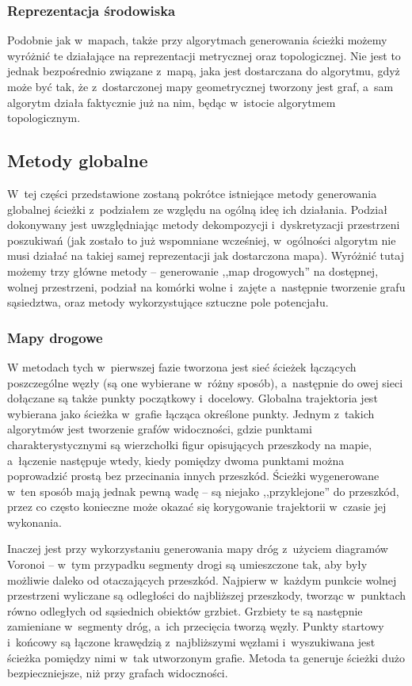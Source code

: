 \subsubsection{Reprezentacja środowiska}

Podobnie jak w~mapach, także przy algorytmach generowania ścieżki możemy wyróżnić
te działające na reprezentacji metrycznej oraz topologicznej. Nie jest to jednak
bezpośrednio związane z~mapą, jaka jest dostarczana do algorytmu, gdyż może być tak,
że z~dostarczonej mapy geometrycznej tworzony jest graf, a~sam algorytm działa faktycznie
już na nim, będąc w~istocie algorytmem topologicznym.

\subsection{Metody globalne}

W~tej części przedstawione zostaną pokrótce istniejące metody generowania globalnej
ścieżki z~podziałem ze względu na ogólną ideę ich działania. Podział dokonywany
jest uwzględniając metody dekompozycji i~dyskretyzacji przestrzeni poszukiwań (jak zostało
to już wspomniane wcześniej, w~ogólności algorytm nie musi działać na takiej samej reprezentacji
jak dostarczona mapa). Wyróżnić tutaj możemy trzy główne metody -- generowanie
,,map drogowych'' na dostępnej, wolnej przestrzeni, podział na komórki wolne i~zajęte
a~następnie tworzenie grafu sąsiedztwa, oraz metody wykorzystujące sztuczne pole potencjału.

\subsubsection{Mapy drogowe}

W metodach tych w~pierwszej fazie tworzona jest sieć ścieżek łączących poszczególne
węzły (są one wybierane w~różny sposób), a~następnie do owej sieci dołączane są
także punkty początkowy i~docelowy. Globalna trajektoria jest wybierana jako ścieżka
w~grafie łącząca określone punkty. Jednym z~takich algorytmów jest tworzenie grafów
widoczności, gdzie punktami charakterystycznymi są wierzchołki figur opisujących
przeszkody na mapie, a~łączenie następuje wtedy, kiedy pomiędzy dwoma punktami można
poprowadzić prostą bez przecinania innych przeszkód. Ścieżki wygenerowane w~ten sposób
mają jednak pewną wadę -- są niejako ,,przyklejone'' do przeszkód, przez co często
konieczne może okazać się korygowanie trajektorii w~czasie jej wykonania.

Inaczej jest przy wykorzystaniu generowania mapy dróg z~użyciem diagramów Voronoi -- w~tym
przypadku segmenty drogi są umieszczone tak, aby były możliwie daleko od otaczających
przeszkód. Najpierw w~każdym punkcie wolnej przestrzeni wyliczane są odległości
do najbliższej przeszkody, tworząc w~punktach równo odległych od sąsiednich obiektów
grzbiet. Grzbiety te są następnie zamieniane w~segmenty dróg, a~ich przecięcia tworzą
węzły. Punkty startowy i~końcowy są łączone krawędzią z~najbliższymi węzłami i~wyszukiwana
jest ścieżka pomiędzy nimi w~tak utworzonym grafie. Metoda ta generuje ścieżki
dużo bezpieczniejsze, niż przy grafach widoczności.


